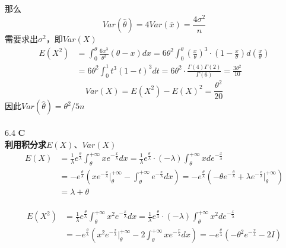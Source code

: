 \documentclass[a4paper]{ctexart}    %
\begin{document}
	那么
	\begin{equation*}
		Var(\hat{\theta}) = 4Var(\bar{x}) = \frac{4\sigma^2}{n}
	\end{equation*}
	需要求出$ \sigma^2 $，即$ Var(X) $
	\begin{equation*}
		\begin{split}
			E(X^2) &= \int_{0}^{\theta}\frac{6x^3}{\theta^3}(\theta - x)dx = 6\theta^2\int_{0}^{\theta} \left(\frac{x}{\theta}\right)^3\cdot \left(1-\frac{x}{\theta}\right)d\left(\frac{x}{\theta}\right) \\
			&= 6\theta^2\int_{0}^{1}t^3(1-t)^3dt = 6\theta^2\cdot \frac{\Gamma(4)\Gamma(2)}{\Gamma(6)} = \frac{3\theta^2}{10}
		\end{split}
	\end{equation*}
	\begin{equation*}
		Var(X) = E(X^2) - E(X)^2 = \frac{\theta^2}{20}
	\end{equation*}
	因此$ Var(\hat{\theta}) = \theta^2/5n $\\
	\\
	6.4 \quad \textbf{C} \\
	\textbf{利用积分求}$ E(X) $、$ Var(X) $ \\
	\begin{equation*}
		\begin{split}
			E(X) &= \frac{1}{\lambda}e^{\frac{\theta}{\lambda}}\int_{\theta}^{+\infty} xe^{-\frac{x}{\lambda}}dx = \frac{1}{\lambda}e^{\frac{\theta}{\lambda}} \cdot (-\lambda) \int_{\theta}^{+\infty} x de^{-\frac{x}{\lambda}} \\
			&= -e^{\frac{\theta}{\lambda}} \left(xe^{-\frac{x}{\lambda}} \bigg|_{\theta}^{+\infty} - \int_{\theta}^{+\infty} e^{-\frac{x}{\lambda}}dx \right) = -e^{\frac{\theta}{\lambda}} \left(-\theta e^{-\frac{\theta}{\lambda}} + \lambda e^{-\frac{x}{\lambda}} \bigg|_{\theta}^{+\infty} \right) \\
			&= \lambda + \theta
		\end{split}
	\end{equation*}
	\\
	\begin{equation*}
		\begin{split}
			E(X^2) &= \frac{1}{\lambda} e^{\frac{\theta}{\lambda}} \int_{\theta}^{+\infty} x^2e^{-\frac{x}{\lambda}}dx = \frac{1}{\lambda} e^{\frac{\theta}{\lambda}} \cdot (-\lambda)
			\int_{\theta}^{+\infty} x^2de^{-\frac{x}{\lambda}} \\
			&= -e^{\frac{\theta}{\lambda}} \left(x^2e^{-\frac{x}{\lambda}} \bigg|_{\theta}^{+\infty} - 2\int_{\theta}^{+\infty} x e^{-\frac{x}{\lambda}}dx\right) = -e^{\frac{\theta}{\lambda}} \left(-\theta^2e^{-\frac{x}{\lambda}} - 2I \right)
		\end{split}
	\end{equation*}
\end{document}
